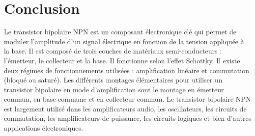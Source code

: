 \newpage
\section*{Conclusion}

Le transistor bipolaire NPN est un composant électronique clé qui permet de moduler l'amplitude d'un signal électrique en fonction de la tension appliquée à la base. Il est composé de trois couches de matériaux semi-conducteurs : l'émetteur, le collecteur et la base. Il fonctionne selon l'effet Schottky. Il existe deux régimes de fonctionnements utilisées : amplification linéaire et commutation (bloqué ou saturé). Les différents montages élémentaires pour utiliser un transistor bipolaire en mode d'amplification sont le montage en émetteur commun, en base commune et en collecteur commun. Le transistor bipolaire NPN est largement utilisé dans les amplificateurs audio, les oscillateurs, les circuits de commutation, les amplificateurs de puissance, les circuits logiques et bien d'autres applications électroniques.